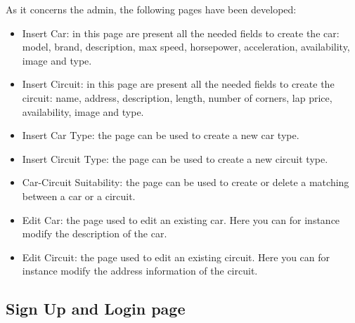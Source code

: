 As it concerns the admin, the following pages have been developed:
\begin{itemize}
    \item Insert Car: in this page are present all the needed fields to create the car: model, brand, description, max speed, horsepower, acceleration, availability, image and type.
    \item Insert Circuit: in this page are present all the needed fields to create the circuit: name, address, description, length, number of corners, lap price, availability, image and type.
    \item Insert Car Type: the page can be used to create a new car type.
    \item Insert Circuit Type: the page can be used to create a new circuit type.
    \item Car-Circuit Suitability: the page can be used to create or delete a matching between a car or a circuit.
    \item Edit Car: the page used to edit an existing car. Here you can for instance modify the description of the car.
    \item Edit Circuit: the page used to edit an existing circuit. Here you can for instance modify the address information of the circuit.
\end{itemize}

\subsection{Sign Up and Login page}

